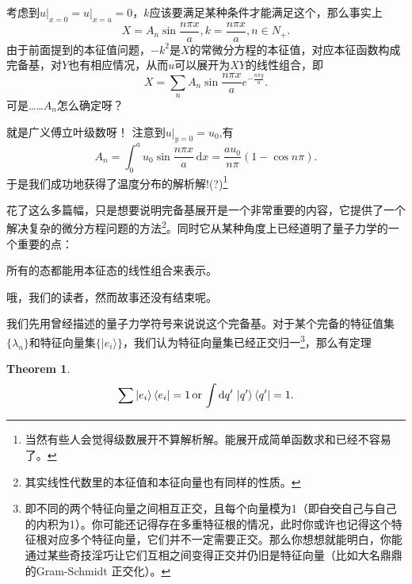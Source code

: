 \documentclass[12pt,a4paper,openany,twoside]{book}
\newtheorem{theorem}{Theorem}[section]
\numberwithin{equation}{section}
\newcommand{\ud}{\mathrm{d}}
\begin{document}
          考虑到$u\big|_{x=0} = u\big|_{x=a} = 0$，$k$应该要满足某种条件才能满足这个，那么事实上
          \begin{equation}
            X = A_n \sin{\frac{n\pi x}{a}} , k = \frac{n\pi x}{a}, n \in N_+.
          \end{equation}
          由于前面提到的本征值问题，$-k^2$是$X$的常微分方程的本征值，对应本征函数构成完备基，对$Y$也有相应情况，从而$u$可以展开为$XY$的线性组合，即
          \begin{equation}
            X = \sum_n A_n \sin{\frac{n\pi x}{a}} e^{- \frac{n\pi y}{a}}.
          \end{equation}
          可是……$A_n$怎么确定呀？
          
          就是广义傅立叶级数呀！
          注意到$u\big|_{y=0} = u_0$,有
          \begin{equation}
            A_n = \int ^a_0 u_0 \sin{\frac{n\pi x}{a}} \, \ud x = \frac{a u_0}{n\pi} (1-\cos{n\pi}) .
          \end{equation}
          于是我们成功地获得了温度分布的解析解!(?)\footnote{当然有些人会觉得级数展开不算解析解。能展开成简单函数求和已经不容易了。}

          花了这么多篇幅，只是想要说明完备基展开是一个非常重要的内容，它提供了一个解决复杂的微分方程问题的方法\footnote{其实线性代数里的本征值和本征向量也有同样的性质。}。同时它从某种角度上已经道明了量子力学的一个重要的点：
          \begin{center}
            所有的态都能用本征态的线性组合来表示。
          \end{center}

          哦，我们的读者，然而故事还没有结束呢。

          我们先用曾经描述的量子力学符号来说说这个完备基。对于某个完备的特征值集$\{\lambda_n\}$和特征向量集$\{| e_i \rangle \}$，我们认为特征向量集已经正交归一\footnote{即不同的两个特征向量之间相互正交，且每个向量模为1（即\sout{自交}自己与自己的内积为1）。你可能还记得存在多重特征根的情况，此时你或许也记得这个特征根对应多个特征向量，它们并不一定需要正交。那么你想想就能明白，你能通过某些奇技淫巧让它们互相之间变得正交并仍旧是特征向量（比如大名鼎鼎的Gram-Schmidt 正交化）。}，那么有定理
          \begin{theorem}
            \begin{equation}
              \sum \ket{e_i}\bra{e_i} = 1 \, \text{or} \, \int \ud q' \, \ket{q'}\bra{q'} = 1.
            \end{equation}
          \end{theorem}
\end{document}

